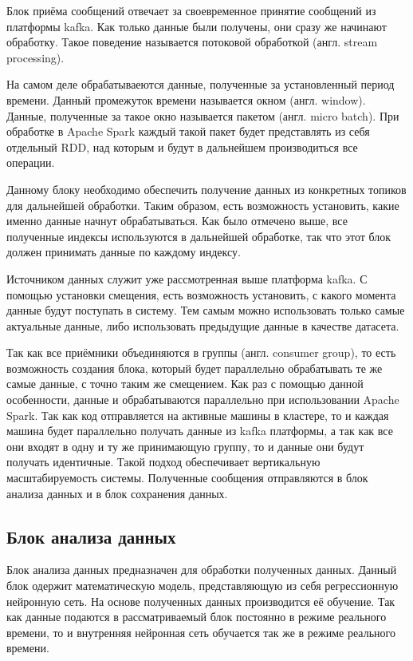 Блок приёма сообщений отвечает за своевременное принятие сообщений из платформы kafka.
Как только данные были получены, они сразу же начинают обработку.
Такое поведение называется потоковой обработкой (англ. stream processing).

На самом деле обрабатываеются данные, полученные за установленный период времени.
Данный промежуток времени называется окном (англ. window).
Данные, полученные за такое окно называется пакетом (англ. micro batch).
При обработке в Apache Spark каждый такой пакет будет представлять из себя отдельный RDD, над которым и будут в дальнейшем производиться все операции.

Данному блоку необходимо обеспечить получение данных из конкретных топиков для дальнейшей обработки.
Таким образом, есть возможность установить, какие именно данные начнут обрабатываться.
Как было отмечено выше, все полученные индексы используются в дальнейшей обработке, так что этот блок должен принимать данные по каждому индексу.

Источником данных служит уже рассмотренная выше платформа kafka.
С помощью установки смещения, есть возможность установить, с какого момента данные будут поступать в систему.
Тем самым можно использовать только самые актуальные данные, либо использовать предыдущие данные в качестве датасета.

Так как все приёмники объединяются в группы (англ. consumer group), то есть возможность создания блока, который будет параллельно обрабатывать те же самые данные, с точно таким же смещением.
Как раз с помощью данной особенности, данные и обрабатываются параллельно при использовании Apache Spark.
Так как код отправляется на активные машины в кластере, то и каждая машина будет параллельно получать данные из kafka платформы, а так как все они входят в одну и ту же принимающую группу, то и данные они будут получать идентичные.
Такой подход обеспечивает вертикальную масштабируемость системы.
Полученные сообщения отправляются в блок анализа данных и в блок сохранения данных.

\subsection{Блок анализа данных}

Блок анализа данных предназначен для обработки полученных данных.
Данный блок одержит математическую модель, представляющую из себя регрессионную нейронную сеть.
На основе полученных данных производится её обучение.
Так как данные подаются в рассматриваемый блок постоянно в режиме реального времени, то и внутренняя нейронная сеть обучается так же в режиме реального времени.

